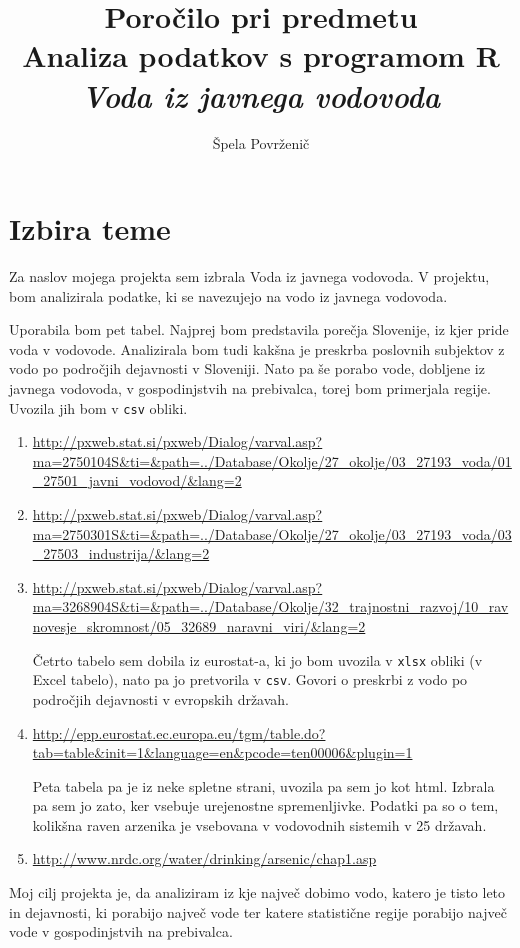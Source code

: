\documentclass[11pt,a4paper]{article}
\begin{document}
\title{Poročilo pri predmetu \\
Analiza podatkov s programom R\\
\vspace{15mm}
\textbf{\emph{Voda iz javnega vodovoda}}}
\author{Špela Povrženič}
\maketitle


\newpage
\section{Izbira teme}
Za naslov mojega projekta sem izbrala Voda iz javnega vodovoda.
V projektu, bom analizirala podatke, ki se navezujejo na vodo iz javnega vodovoda. 

Uporabila bom pet tabel. 
Najprej bom predstavila porečja Slovenije, iz kjer pride voda v vodovode. Analizirala bom tudi kakšna je preskrba poslovnih subjektov z vodo po področjih dejavnosti v Sloveniji. Nato pa še porabo vode, dobljene iz javnega vodovoda, v gospodinjstvih na prebivalca, torej bom primerjala regije. Uvozila jih bom v \verb|csv| obliki.

\begin{enumerate} 
\item{\url{http://pxweb.stat.si/pxweb/Dialog/varval.asp?ma=2750104S&ti=&path=../Database/Okolje/27_okolje/03_27193_voda/01_27501_javni_vodovod/&lang=2}}

\item{\url{http://pxweb.stat.si/pxweb/Dialog/varval.asp?ma=2750301S&ti=&path=../Database/Okolje/27_okolje/03_27193_voda/03_27503_industrija/&lang=2}}

\item{\url{http://pxweb.stat.si/pxweb/Dialog/varval.asp?ma=3268904S&ti=&path=../Database/Okolje/32_trajnostni_razvoj/10_ravnovesje_skromnost/05_32689_naravni_viri/&lang=2}}

Četrto tabelo sem dobila iz eurostat-a, ki jo bom uvozila v \verb|xlsx| obliki (v Excel tabelo), nato pa jo pretvorila v \verb|csv|. Govori o preskrbi z vodo po področjih dejavnosti v evropskih državah.

\item{\url{http://epp.eurostat.ec.europa.eu/tgm/table.do?tab=table&init=1&language=en&pcode=ten00006&plugin=1}}

Peta tabela pa je iz neke spletne strani, uvozila pa sem jo kot html. Izbrala pa sem jo zato, ker vsebuje urejenostne spremenljivke. Podatki pa so o tem, kolikšna raven arzenika je vsebovana v vodovodnih sistemih v 25 državah.

\item{\url{http://www.nrdc.org/water/drinking/arsenic/chap1.asp}}
\end{enumerate}
Moj cilj projekta je, da analiziram iz kje največ dobimo vodo, katero je tisto leto in  dejavnosti, ki porabijo največ vode ter katere statistične regije porabijo največ vode v gospodinjstvih na prebivalca. 
\end{document}
